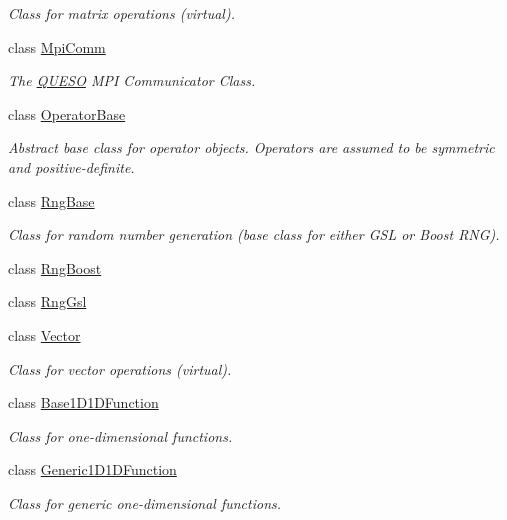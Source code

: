 \begin{DoxyCompactItemize}
\begin{DoxyCompactList}\small\item\em Class for matrix operations (virtual). \end{DoxyCompactList}\item 
class \hyperlink{class_q_u_e_s_o_1_1_mpi_comm}{Mpi\-Comm}
\begin{DoxyCompactList}\small\item\em The \hyperlink{namespace_q_u_e_s_o}{Q\-U\-E\-S\-O} M\-P\-I Communicator Class. \end{DoxyCompactList}\item 
class \hyperlink{class_q_u_e_s_o_1_1_operator_base}{Operator\-Base}
\begin{DoxyCompactList}\small\item\em Abstract base class for operator objects. Operators are assumed to be symmetric and positive-\/definite. \end{DoxyCompactList}\item 
class \hyperlink{class_q_u_e_s_o_1_1_rng_base}{Rng\-Base}
\begin{DoxyCompactList}\small\item\em Class for random number generation (base class for either G\-S\-L or Boost R\-N\-G). \end{DoxyCompactList}\item 
class \hyperlink{class_q_u_e_s_o_1_1_rng_boost}{Rng\-Boost}
\item 
class \hyperlink{class_q_u_e_s_o_1_1_rng_gsl}{Rng\-Gsl}
\item 
class \hyperlink{class_q_u_e_s_o_1_1_vector}{Vector}
\begin{DoxyCompactList}\small\item\em Class for vector operations (virtual). \end{DoxyCompactList}\item 
class \hyperlink{class_q_u_e_s_o_1_1_base1_d1_d_function}{Base1\-D1\-D\-Function}
\begin{DoxyCompactList}\small\item\em Class for one-\/dimensional functions. \end{DoxyCompactList}\item 
class \hyperlink{class_q_u_e_s_o_1_1_generic1_d1_d_function}{Generic1\-D1\-D\-Function}
\begin{DoxyCompactList}\small\item\em Class for generic one-\/dimensional functions. \end{DoxyCompactList}\item 

\end{DoxyCompactItemize}

